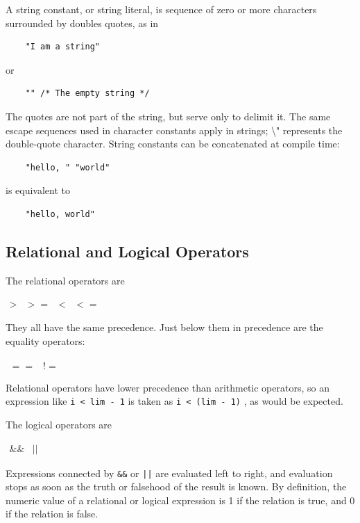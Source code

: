 \documentclass{scrartcl}
\begin{document}
        A string constant, or string literal, is sequence of zero or more
        characters surrounded by doubles quotes, as in
        \begin{lstlisting}
    "I am a string"
        \end{lstlisting}
        or
        \begin{lstlisting}
    "" /* The empty string */
        \end{lstlisting}
        The quotes are not part of the string, but serve only to delimit it. The
        same escape sequences used in character constants apply in strings;
        \textbackslash " represents the double-quote character. String constants
        can be concatenated at compile time:
        \begin{lstlisting}
    "hello, " "world"
        \end{lstlisting}
        is equivalent to
        \begin{lstlisting}
    "hello, world"
        \end{lstlisting}

        \subsection{Relational and Logical Operators}
            The relational operators are

$\begin{array}{llll}
> & >= & < & <=
\end{array}$

            They all have the same precedence. Just below them in precedence are
            the equality operators:

$\begin{array}{ll}
== & !=
\end{array}$

            Relational operators have lower precedence than arithmetic operators,
            so an expression like \texttt{i < lim - 1} is taken as \texttt{i < (lim - 1)}
            , as would be expected.

            The logical operators are

$\begin{array}{ll}
\&\& & ||
\end{array}$

            Expressions connected by \texttt{\&\&} or \texttt{||} are evaluated
            left to right, and evaluation stops as soon as the truth or falsehood
            of the result is known. By definition, the numeric value of a relational
            or logical expression is 1 if the relation is true, and 0 if the relation
            is false.
\end{document}
